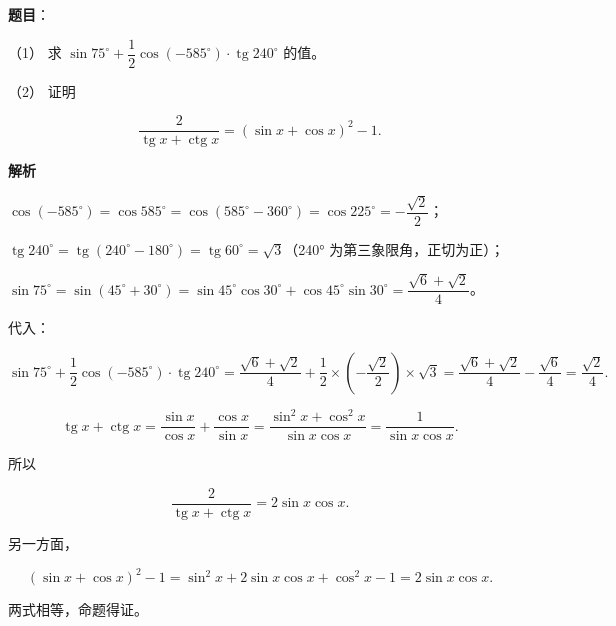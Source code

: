 \begin{answer}

\textbf{题目}：

（1） 求 $\sin75^\circ+\dfrac12\cos(-585^\circ)\cdot\operatorname{tg}240^\circ$ 的值。

（2） 证明

\nopagebreak[4]
\[
\frac{2}{\operatorname{tg}x+\operatorname{ctg}x}=(\sin x+\cos x)^2-1.
\]

\textbf{解析}


$\cos(-585^\circ)=\cos585^\circ=\cos(585^\circ-360^\circ)=\cos225^\circ=-\dfrac{\sqrt2}{2}$；

$\operatorname{tg}240^\circ=\operatorname{tg}(240^\circ-180^\circ)=\operatorname{tg}60^\circ=\sqrt3$（240° 为第三象限角，正切为正）；

$\sin75^\circ=\sin(45^\circ+30^\circ)=\sin45^\circ\cos30^\circ+\cos45^\circ\sin30^\circ=\dfrac{\sqrt6+\sqrt2}{4}$。

代入：

\nopagebreak[4]
\[
\sin75^\circ+\frac12\cos(-585^\circ)\cdot\operatorname{tg}240^\circ
=\frac{\sqrt6+\sqrt2}{4}+\frac12\times\left(-\frac{\sqrt2}{2}\right)\times\sqrt3
=\frac{\sqrt6+\sqrt2}{4}-\frac{\sqrt6}{4}=\frac{\sqrt2}{4}.
\]


\nopagebreak[4]
\[
\operatorname{tg}x+\operatorname{ctg}x
=\frac{\sin x}{\cos x}+\frac{\cos x}{\sin x}
=\frac{\sin^2x+\cos^2x}{\sin x\cos x}
=\frac{1}{\sin x\cos x}.
\]

所以

\nopagebreak[4]
\[
\frac{2}{\operatorname{tg}x+\operatorname{ctg}x}=2\sin x\cos x.
\]

另一方面，

\nopagebreak[4]
\[
(\sin x+\cos x)^2-1=\sin^2x+2\sin x\cos x+\cos^2x-1=2\sin x\cos x.
\]

两式相等，命题得证。



\end{answer}
